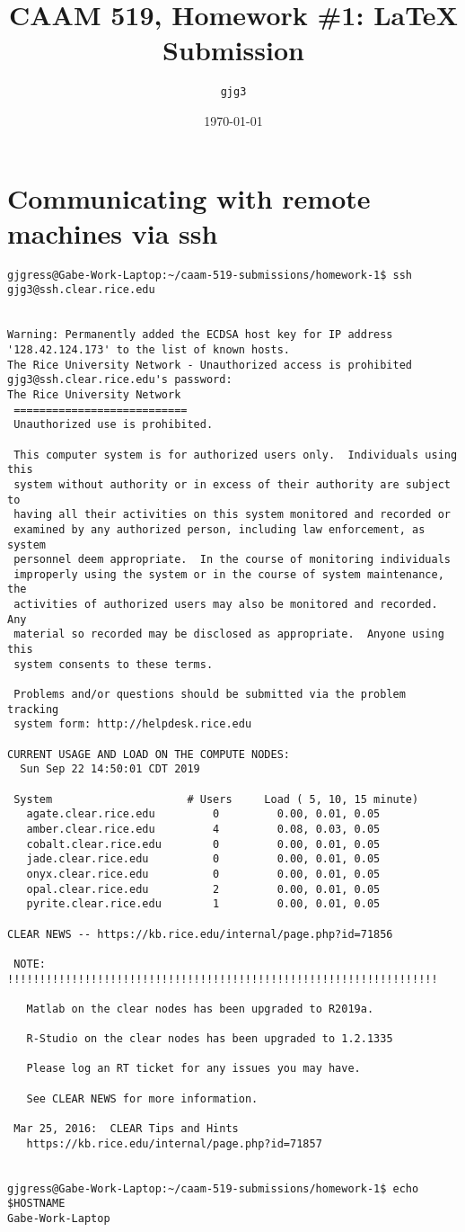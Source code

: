 \documentclass{article}
\title{CAAM 519, Homework \#1: \LaTeX{} Submission}
\author{\texttt{gjg3}}
\date{\today}
\begin{document}
\maketitle

\section{Communicating with remote machines via ssh}
\begin{verbatim}
gjgress@Gabe-Work-Laptop:~/caam-519-submissions/homework-1$ ssh gjg3@ssh.clear.rice.edu


Warning: Permanently added the ECDSA host key for IP address '128.42.124.173' to the list of known hosts.
The Rice University Network - Unauthorized access is prohibited
gjg3@ssh.clear.rice.edu's password: 
The Rice University Network
 ===========================
 Unauthorized use is prohibited.
 
 This computer system is for authorized users only.  Individuals using this
 system without authority or in excess of their authority are subject to
 having all their activities on this system monitored and recorded or
 examined by any authorized person, including law enforcement, as system
 personnel deem appropriate.  In the course of monitoring individuals
 improperly using the system or in the course of system maintenance, the
 activities of authorized users may also be monitored and recorded.  Any
 material so recorded may be disclosed as appropriate.  Anyone using this
 system consents to these terms.
 
 Problems and/or questions should be submitted via the problem tracking
 system form: http://helpdesk.rice.edu
 
CURRENT USAGE AND LOAD ON THE COMPUTE NODES:
  Sun Sep 22 14:50:01 CDT 2019

 System                   	# Users   	Load ( 5, 10, 15 minute)      
   agate.clear.rice.edu   	    0     	  0.00, 0.01, 0.05            
   amber.clear.rice.edu   	    4     	  0.08, 0.03, 0.05            
   cobalt.clear.rice.edu  	    0     	  0.00, 0.01, 0.05            
   jade.clear.rice.edu    	    0     	  0.00, 0.01, 0.05            
   onyx.clear.rice.edu    	    0     	  0.00, 0.01, 0.05            
   opal.clear.rice.edu    	    2     	  0.00, 0.01, 0.05            
   pyrite.clear.rice.edu  	    1     	  0.00, 0.01, 0.05            

CLEAR NEWS -- https://kb.rice.edu/internal/page.php?id=71856
 
 NOTE: !!!!!!!!!!!!!!!!!!!!!!!!!!!!!!!!!!!!!!!!!!!!!!!!!!!!!!!!!!!!!!!!!!!
 
   Matlab on the clear nodes has been upgraded to R2019a.
 
   R-Studio on the clear nodes has been upgraded to 1.2.1335
 
   Please log an RT ticket for any issues you may have.
 
   See CLEAR NEWS for more information.
 
 Mar 25, 2016:  CLEAR Tips and Hints 
   https://kb.rice.edu/internal/page.php?id=71857


gjgress@Gabe-Work-Laptop:~/caam-519-submissions/homework-1$ echo $HOSTNAME
Gabe-Work-Laptop
\end{verbatim}
\end{document}
